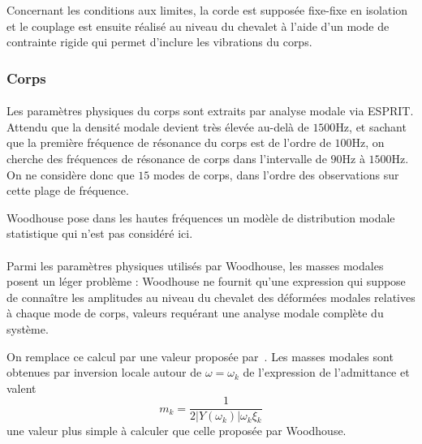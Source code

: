   Concernant les conditions aux limites, la corde est supposée fixe-fixe
en isolation et le couplage est ensuite réalisé au niveau du chevalet à l'aide
d'un mode de contrainte rigide qui permet d'inclure les vibrations du corps.

\subsubsection{Corps}

  \paragraph{}
  Les paramètres physiques du corps sont extraits par analyse modale via ESPRIT.
Attendu que la densité modale devient très élevée au-delà de \( \si{1500\Hz} \),
et sachant que la première fréquence de résonance du corps est de l'ordre de
\( \si{100\Hz} \), on cherche des fréquences de résonance de corps dans
l'intervalle de \( \si{90\Hz} \) à \( \si{1500\Hz} \).
On ne considère donc que \( 15 \) modes de corps, dans l'ordre des observations
sur cette plage de fréquence.

Woodhouse pose dans les hautes fréquences un modèle de distribution modale
statistique qui n'est pas considéré ici.

    

\paragraph*{}

Parmi les paramètres physiques utilisés par Woodhouse, les masses modales
posent un léger problème : Woodhouse ne fournit qu'une expression qui suppose
de connaître les amplitudes au niveau du chevalet des déformées modales
relatives à chaque mode de corps, valeurs requérant une analyse modale
complète du système.
  
  On remplace ce calcul par une valeur proposée par~\textcite{pate14:phd}.
  Les masses modales sont obtenues par inversion locale autour de
\( \omega = \omega_k \) de l'expression de l'admittance et
valent \[ m_k = \frac{1}{2 |Y(\omega_k)| \omega{}_k \xi{}_k} \] une valeur plus
simple à calculer que celle proposée par Woodhouse.

